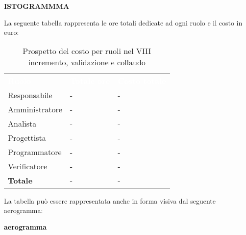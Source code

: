\textbf{ISTOGRAMMMA}


La seguente tabella rappresenta le ore totali dedicate ad ogni ruolo e il costo in euro:

\begin{table}[!htbp]
\begin{center}
\renewcommand{\arraystretch}{1.5}
\begin{tabular}{ m{}<{\centering}  m{}<{\centering} m{}<{\centering}}
	\rowcolor{darkblue}
	\textcolor{white}{\textbf{Ruolo}}&\textcolor{white}{\textbf{Totale ore}}&\textcolor{white}{\textbf{Costo totale}}\\ 

	Responsabile  & - & - \\	

	\rowcolor{gray!10} Amministratore & - & - \\
	
	Analista & - & - \\
	
	\rowcolor{gray!10} Progettista & - & - \\
	
	Programmatore & - & - \\
	
	\rowcolor{gray!10} Verificatore & - & - \\
	
	\textbf{Totale} & - & - \\
	
\end{tabular}
\caption{Prospetto del costo per ruoli nel VIII incremento,  validazione e collaudo}
\end{center}
\end{table}

La tabella può essere rappresentata anche in forma visiva dal seguente aerogramma:

\textbf{aerogramma}



